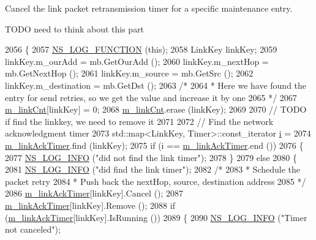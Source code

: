 Cancel the link packet retransmission timer for a specific maintenance entry. 

T\+O\+DO need to think about this part 
\begin{DoxyCode}
2056 \{
2057   \hyperlink{log-macros-disabled_8h_a90b90d5bad1f39cb1b64923ea94c0761}{NS\_LOG\_FUNCTION} (\textcolor{keyword}{this});
2058   LinkKey linkKey;
2059   linkKey.m\_ourAdd = mb.GetOurAdd ();
2060   linkKey.m\_nextHop = mb.GetNextHop ();
2061   linkKey.m\_source = mb.GetSrc ();
2062   linkKey.m\_destination = mb.GetDst ();
2063   \textcolor{comment}{/*}
2064 \textcolor{comment}{   * Here we have found the entry for send retries, so we get the value and increase it by one}
2065 \textcolor{comment}{   */}
2067   \hyperlink{classns3_1_1dsr_1_1DsrRouting_a85ba159639f9bc13b3d8890458128a79}{m\_linkCnt}[linkKey] = 0;
2068   \hyperlink{classns3_1_1dsr_1_1DsrRouting_a85ba159639f9bc13b3d8890458128a79}{m\_linkCnt}.erase (linkKey);
2069 
2070   \textcolor{comment}{// TODO if find the linkkey, we need to remove it}
2071 
2072   \textcolor{comment}{// Find the network acknowledgment timer}
2073   std::map<LinkKey, Timer>::const\_iterator \hyperlink{bernuolliDistribution_8m_a6f6ccfcf58b31cb6412107d9d5281426}{i} =
2074     \hyperlink{classns3_1_1dsr_1_1DsrRouting_ad532172035dbd4b038de0e94f4ce5ff6}{m\_linkAckTimer}.find (linkKey);
2075   \textcolor{keywordflow}{if} (i == \hyperlink{classns3_1_1dsr_1_1DsrRouting_ad532172035dbd4b038de0e94f4ce5ff6}{m\_linkAckTimer}.end ())
2076     \{
2077       \hyperlink{group__logging_gafbd73ee2cf9f26b319f49086d8e860fb}{NS\_LOG\_INFO} (\textcolor{stringliteral}{"did not find the link timer"});
2078     \}
2079   \textcolor{keywordflow}{else}
2080     \{
2081       \hyperlink{group__logging_gafbd73ee2cf9f26b319f49086d8e860fb}{NS\_LOG\_INFO} (\textcolor{stringliteral}{"did find the link timer"});
2082       \textcolor{comment}{/*}
2083 \textcolor{comment}{       * Schedule the packet retry}
2084 \textcolor{comment}{       * Push back the nextHop, source, destination address}
2085 \textcolor{comment}{       */}
2086       \hyperlink{classns3_1_1dsr_1_1DsrRouting_ad532172035dbd4b038de0e94f4ce5ff6}{m\_linkAckTimer}[linkKey].Cancel ();
2087       \hyperlink{classns3_1_1dsr_1_1DsrRouting_ad532172035dbd4b038de0e94f4ce5ff6}{m\_linkAckTimer}[linkKey].Remove ();
2088       \textcolor{keywordflow}{if} (\hyperlink{classns3_1_1dsr_1_1DsrRouting_ad532172035dbd4b038de0e94f4ce5ff6}{m\_linkAckTimer}[linkKey].IsRunning ())
2089         \{
2090           \hyperlink{group__logging_gafbd73ee2cf9f26b319f49086d8e860fb}{NS\_LOG\_INFO} (\textcolor{stringliteral}{"Timer not canceled"});

\end{DoxyCode}
